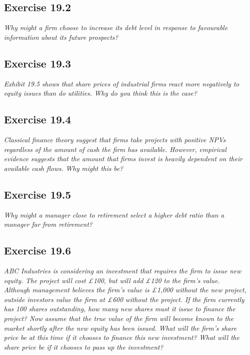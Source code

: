 \documentclass[]{book}
\theoremstyle{definition}
\theoremstyle{definition}
\theoremstyle{remark}
\begin{document}
\subsection{Exercise 19.2}\label{exercise-19.2}

\emph{Why might a firm choose to increase its debt level in response to
favourable information about its future prospects?} \citep[p.641]{book}

\subsection{Exercise 19.3}\label{exercise-19.3}

\emph{Exhibit 19.5 shows that share prices of industrial firms react
more negatively to equity issues than do utilities. Why do you think
this is the case?} \citep[p.641]{book}

\subsection{Exercise 19.4}\label{exercise-19.4}

\emph{Classical finance theory suggest that firms take projects with
positive NPVs regardless of the amount of cash the firm has available.
However, empirical evidence suggests that the amount that firms invest
is heavily dependent on their available cash flows. Why might this be?}
\citep[p.641]{book}

\subsection{Exercise 19.5}\label{exercise-19.5}

\emph{Why might a manager close to retirement select a higher debt ratio
than a manager far from retirement?} \citep[p.641]{book}

\subsection{Exercise 19.6}\label{exercise-19.6}

\emph{ABC Industries is considering an investment that requires the firm
to issue new equity. The project will cost £100, but will add £120 to
the firm's value. Although management believes the firm's value is
£1,000 without the new project, outside investors value the firm at £600
without the project. If the firm currently has 100 shares outstanding,
how many new shares must it issue to finance the project? Now assume
that the true value of the firm will become known to the market shortly
after the new equity has been issued. What will the firm's share price
be at this time if it chooses to finance this new investment? What will
the share price be if it chooses to pass up the investment?}
\citep[p.641]{book}
\end{document}

